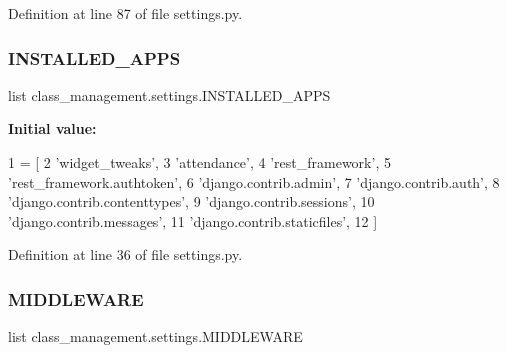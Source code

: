 Definition at line 87 of file settings.\+py.

\hypertarget{namespaceclass__management_1_1settings_a1f1a7bd799a5fcc5d043bfc75ba98723}{}\label{namespaceclass__management_1_1settings_a1f1a7bd799a5fcc5d043bfc75ba98723} 
\subsubsection{\texorpdfstring{I\+N\+S\+T\+A\+L\+L\+E\+D\+\_\+\+A\+P\+PS}{INSTALLED\_APPS}}
{\footnotesize\ttfamily list class\+\_\+management.\+settings.\+I\+N\+S\+T\+A\+L\+L\+E\+D\+\_\+\+A\+P\+PS}

{\bfseries Initial value\+:}
\begin{DoxyCode}
1 =  [
2     \textcolor{stringliteral}{'widget\_tweaks'},
3     \textcolor{stringliteral}{'attendance'},
4     \textcolor{stringliteral}{'rest\_framework'},
5     \textcolor{stringliteral}{'rest\_framework.authtoken'},
6     \textcolor{stringliteral}{'django.contrib.admin'},
7     \textcolor{stringliteral}{'django.contrib.auth'},
8     \textcolor{stringliteral}{'django.contrib.contenttypes'},
9     \textcolor{stringliteral}{'django.contrib.sessions'},
10     \textcolor{stringliteral}{'django.contrib.messages'},
11     \textcolor{stringliteral}{'django.contrib.staticfiles'},
12 ]
\end{DoxyCode}


Definition at line 36 of file settings.\+py.

\hypertarget{namespaceclass__management_1_1settings_a35666808ed9c0450d77e7d8705c0b56b}{}\label{namespaceclass__management_1_1settings_a35666808ed9c0450d77e7d8705c0b56b} 
\subsubsection{\texorpdfstring{M\+I\+D\+D\+L\+E\+W\+A\+RE}{MIDDLEWARE}}
{\footnotesize\ttfamily list class\+\_\+management.\+settings.\+M\+I\+D\+D\+L\+E\+W\+A\+RE}

